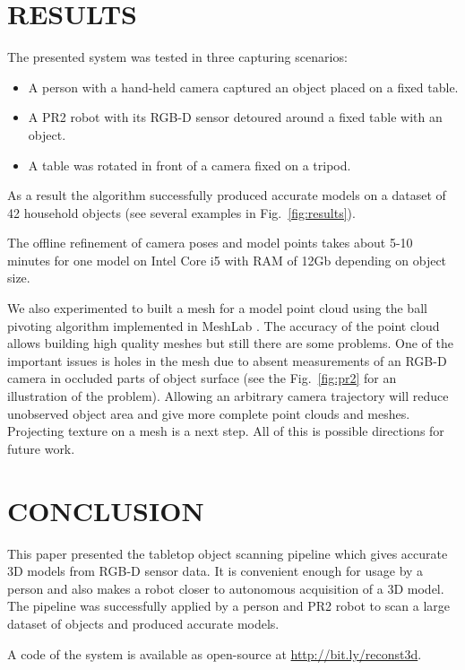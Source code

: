 \documentclass[letterpaper, 10 pt, conference]{ieeeconf}  %
\begin{document}
\section{RESULTS}
 
The presented system was tested in three capturing scenarios:

\begin{itemize}
 \item A person with a hand-held camera captured an object placed on a fixed table.
 \item A PR2 robot with its RGB-D sensor detoured around a fixed table with an object.
 \item A table was rotated in front of a camera fixed on a tripod.
\end{itemize}

As a result the algorithm successfully produced accurate models 
on a dataset of 42 household objects
(see several examples in Fig.~\ref{fig:results}).

The offline refinement of camera poses 
and model points takes about 5-10 minutes for one model on Intel Core i5 with RAM of 12Gb 
depending on object size.

We also experimented to built a mesh for a model point cloud using 
the ball pivoting algorithm \cite{bernardini1999ball}
implemented in MeshLab \cite{meshlab}. The accuracy of 
the point cloud allows building high quality meshes but still there
are some problems. One of the important issues is holes in 
the mesh due to absent measurements of an RGB-D camera in occluded parts of object surface 
(see the Fig.~\ref{fig:pr2} for an illustration of the problem).
Allowing an arbitrary camera 
trajectory will reduce unobserved object area and give more complete
point clouds and meshes. Projecting texture on a mesh is a next step.
All of this is possible directions for future work.


\section{CONCLUSION}

This paper presented the tabletop object scanning pipeline
which gives accurate 3D models from RGB-D sensor data.
It is convenient enough for usage by a person and also makes a robot closer
to autonomous acquisition of a 3D model. The pipeline 
was successfully applied by a person and PR2 robot 
to scan a large dataset of objects and produced 
accurate models.

A code of the system is available as open-source at
\href{http://bit.ly/reconst3d}{http://bit.ly/reconst3d}.
\end{document}

